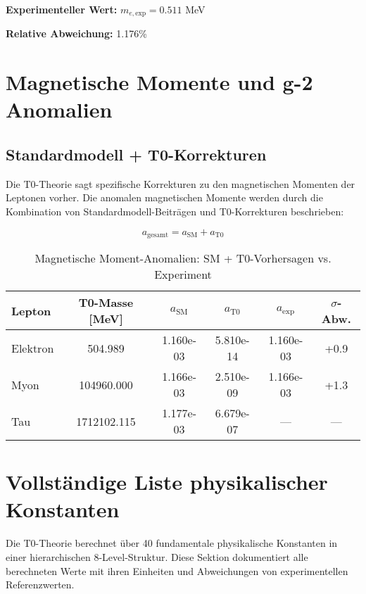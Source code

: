\documentclass[11pt,a4paper]{article}
\begin{document}
	\textbf{Experimenteller Wert:} $m_{e,\text{exp}} = 0.511$ MeV
	
	\textbf{Relative Abweichung:} 1.176\%
	
	\section{Magnetische Momente und g-2 Anomalien}
	
	\subsection{Standardmodell + T0-Korrekturen}
	
	Die T0-Theorie sagt spezifische Korrekturen zu den magnetischen Momenten der Leptonen vorher. Die anomalen magnetischen Momente werden durch die Kombination von Standardmodell-Beiträgen und T0-Korrekturen beschrieben:
	
	\begin{equation}
		a_{\text{gesamt}} = a_{\text{SM}} + a_{\text{T0}}
	\end{equation}
	
	\begin{table}[h]
		\centering
		\begin{tabular}{>{\raggedright}p{4cm}ccccc}
			\toprule
			\textbf{Lepton} & \textbf{T0-Masse [MeV]} & \textbf{$a_{\text{SM}}$} & \textbf{$a_{\text{T0}}$} & \textbf{$a_{\text{exp}}$} & \textbf{$\sigma$-Abw.} \\
			\midrule
			Elektron & 504.989 & 1.160e-03 & 5.810e-14 & 1.160e-03 & +0.9 \\
			Myon & 104960.000 & 1.166e-03 & 2.510e-09 & 1.166e-03 & +1.3 \\
			Tau & 1712102.115 & 1.177e-03 & 6.679e-07 & --- & --- \\
			\bottomrule
		\end{tabular}
		\caption{Magnetische Moment-Anomalien: SM + T0-Vorhersagen vs. Experiment}
	\end{table}
	
	\section{Vollständige Liste physikalischer Konstanten}
	
	Die T0-Theorie berechnet über 40 fundamentale physikalische Konstanten in einer hierarchischen 8-Level-Struktur. Diese Sektion dokumentiert alle berechneten Werte mit ihren Einheiten und Abweichungen von experimentellen Referenzwerten.
	
\end{document}
